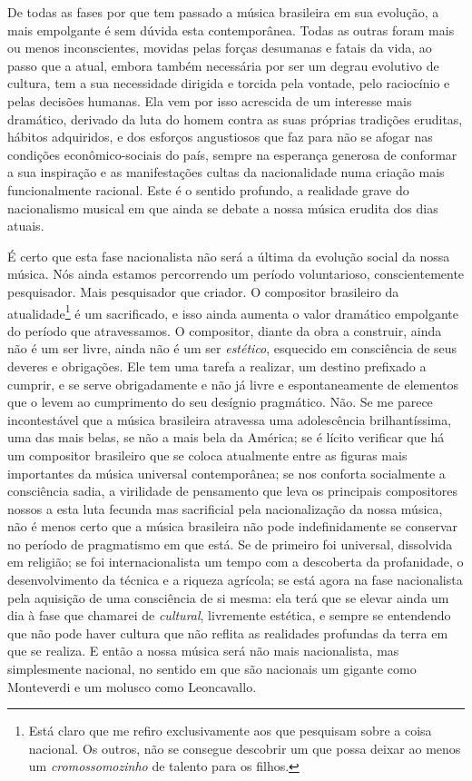 De todas as fases por que tem passado a música brasileira em sua
evolução, a mais empolgante é sem dúvida esta contemporânea. Todas as
outras foram mais ou menos inconscientes, movidas pelas forças desumanas
e fatais da vida, ao passo que a atual, embora também necessária por ser
um degrau evolutivo de cultura, tem a sua necessidade dirigida e torcida
pela vontade, pelo raciocínio e pelas decisões humanas. Ela vem por isso
acrescida de um interesse mais dramático, derivado da luta do homem
contra as suas próprias tradições eruditas, hábitos adquiridos, e dos
esforços angustiosos que faz para não se afogar nas condições
econômico-sociais do país, sempre na esperança generosa de conformar a
sua inspiração e as manifestações cultas da nacionalidade numa criação
mais funcionalmente racional. Este é o sentido profundo, a realidade
grave do nacionalismo musical em que ainda se debate a nossa música
erudita dos dias atuais.

É certo que esta fase nacionalista não será a última da evolução social
da nossa música. Nós ainda estamos percorrendo um período voluntarioso,
conscientemente pesquisador. Mais pesquisador que criador. O compositor
brasileiro da atualidade\footnote{Está claro que me refiro exclusivamente aos que pesquisam sobre a
coisa nacional. Os outros, não se consegue descobrir um que possa deixar
ao menos um \textit{cromossomozinho} de talento para os filhos.} é um sacrificado, e isso ainda aumenta o
valor dramático empolgante do período que atravessamos. O compositor,
diante da obra a construir, ainda não é um ser livre, ainda não é um ser
\textit{estético}, esquecido em consciência de seus deveres e obrigações. Ele
tem uma tarefa a realizar, um destino prefixado a cumprir, e se serve
obrigadamente e não já livre e espontaneamente de elementos que o levem
ao cumprimento do seu desígnio pragmático. Não. Se me parece
incontestável que a música brasileira atravessa uma adolescência
brilhantíssima, uma das mais belas, se não a mais bela da América; se é
lícito verificar que há um compositor brasileiro que se coloca
atualmente entre as figuras mais importantes da música universal
contemporânea; se nos conforta socialmente a consciência sadia, a
virilidade de pensamento que leva os principais compositores nossos a
esta luta fecunda mas sacrificial pela nacionalização da nossa música,
não é menos certo que a música brasileira não pode indefinidamente se
conservar no período de pragmatismo em que está. Se de primeiro foi
universal, dissolvida em religião; se foi internacionalista um tempo com
a descoberta da profanidade, o desenvolvimento da técnica e a riqueza
agrícola; se está agora na fase nacionalista pela aquisição de uma
consciência de si mesma: ela terá que se elevar ainda um dia à fase que
chamarei de \textit{cultural}, livremente estética, e sempre se entendendo que
não pode haver cultura que não reflita as realidades profundas da terra
em que se realiza. E então a nossa música será não mais nacionalista,
mas simplesmente nacional, no sentido em que são nacionais um gigante
como Monteverdi e um molusco como Leoncavallo.

